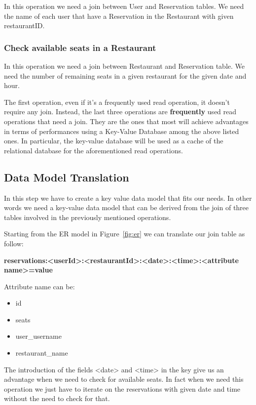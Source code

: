 In this operation we need a join between User and Reservation tables.  We need
the name of each user that have a Reservation in the Restaurant with given
restaurantID.

\subsubsection{Check available seats in a Restaurant}

In this operation we need a join between Restaurant and Reservation table. We
need the number of remaining seats in a given restaurant for the given date and
hour.

The first operation, even if it's a frequently used read operation, it doesn't
require any join.  Instead, the last three operations are \textbf{frequently}
used read operations that need a join. They are the ones that most will achieve
advantages in terms of performances using a Key-Value Database among the above
listed ones. In particular, the key-value database will be used as a cache of
the relational database for the aforementioned read operations.

\subsection{Data Model Translation}

In this step we have to create a key value data model that fits our needs.  In
other words we need a key-value data model that can be derived from the join of
three tables involved in the previously mentioned operations.

Starting from the ER model in Figure~\ref{fig:er} we can translate our join
table as follow:

\vspace{0.75cm}

\centerline{\textbf{reservations:<userId>:<restaurantId>:<date>:<time>:<attribute name>=value}}

\vspace{0.75cm}

Attribute name can be:
\begin{itemize}
	\item id
	\item seats
	\item user\_username
	\item restaurant\_name
\end{itemize}

\vspace{0.75cm}
The introduction of the fields <date> and <time> in the key give us an advantage 
when we need to check for available seats. In fact when we need this operation
we just have to iterate on the reservations with given date and time without the
need to check for that. 

\vfill
